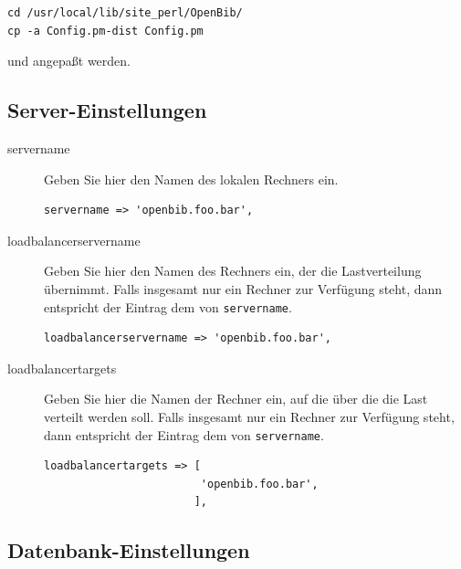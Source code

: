 \documentclass[11pt, twoside, a4paper, BCOR8mm, DIV12, bibtotoc,idxtotoc]{scrbook}
\begin{document}
\begin{verbatim}
cd /usr/local/lib/site_perl/OpenBib/
cp -a Config.pm-dist Config.pm
\end{verbatim}

und angepaßt werden.


\subsection{Server-Einstellungen}

\begin{description}
\item[servername] Geben Sie hier den Namen des lokalen Rechners
  ein. 
\begin{verbatim}
servername => 'openbib.foo.bar',
\end{verbatim}

\item[loadbalancerservername] Geben Sie hier den Namen des Rechners
  ein, der die Lastverteilung übernimmt. Falls insgesamt nur ein
  Rechner zur Verfügung steht, dann entspricht der Eintrag dem von
  \texttt{servername}.
\begin{verbatim}
loadbalancerservername => 'openbib.foo.bar',
\end{verbatim}

\item[loadbalancertargets] Geben Sie hier die Namen der Rechner ein,
  auf die über die die Last verteilt werden soll. Falls insgesamt nur
  ein Rechner zur Verfügung steht, dann entspricht der Eintrag dem
  von \texttt{servername}.
\begin{verbatim}
loadbalancertargets => [
                        'openbib.foo.bar',
                       ],
\end{verbatim}
\end{description}


\subsection{Datenbank-Einstellungen}
\end{document}
